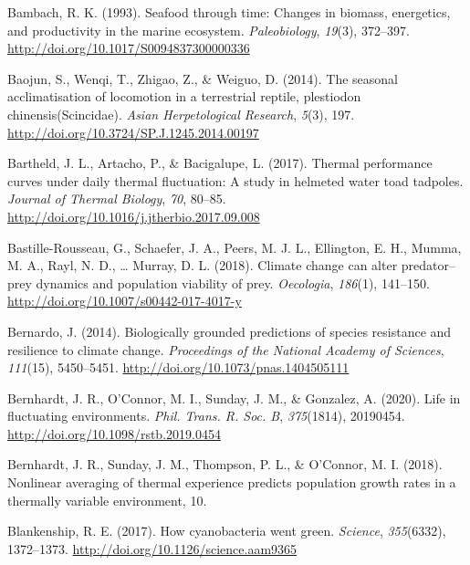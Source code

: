 \documentclass[12pt,twoside]{reedthesis}
\begin{document}
\leavevmode\hypertarget{ref-bambach_seafood_1993}{}%
Bambach, R. K. (1993). Seafood through time: Changes in biomass, energetics, and productivity in the marine ecosystem. \emph{Paleobiology}, \emph{19}(3), 372--397. \url{http://doi.org/10.1017/S0094837300000336}

\leavevmode\hypertarget{ref-baojun_seasonal_2014}{}%
Baojun, S., Wenqi, T., Zhigao, Z., \& Weiguo, D. (2014). The seasonal acclimatisation of locomotion in a terrestrial reptile, plestiodon chinensis(Scincidae). \emph{Asian Herpetological Research}, \emph{5}(3), 197. \url{http://doi.org/10.3724/SP.J.1245.2014.00197}

\leavevmode\hypertarget{ref-bartheld_thermal_2017-2}{}%
Bartheld, J. L., Artacho, P., \& Bacigalupe, L. (2017). Thermal performance curves under daily thermal fluctuation: A study in helmeted water toad tadpoles. \emph{Journal of Thermal Biology}, \emph{70}, 80--85. \url{http://doi.org/10.1016/j.jtherbio.2017.09.008}

\leavevmode\hypertarget{ref-bastille-rousseau_climate_2018}{}%
Bastille-Rousseau, G., Schaefer, J. A., Peers, M. J. L., Ellington, E. H., Mumma, M. A., Rayl, N. D., \ldots{} Murray, D. L. (2018). Climate change can alter predator--prey dynamics and population viability of prey. \emph{Oecologia}, \emph{186}(1), 141--150. \url{http://doi.org/10.1007/s00442-017-4017-y}

\leavevmode\hypertarget{ref-bernardo_biologically_2014}{}%
Bernardo, J. (2014). Biologically grounded predictions of species resistance and resilience to climate change. \emph{Proceedings of the National Academy of Sciences}, \emph{111}(15), 5450--5451. \url{http://doi.org/10.1073/pnas.1404505111}

\leavevmode\hypertarget{ref-bernhardt_life_2020}{}%
Bernhardt, J. R., O'Connor, M. I., Sunday, J. M., \& Gonzalez, A. (2020). Life in fluctuating environments. \emph{Phil. Trans. R. Soc. B}, \emph{375}(1814), 20190454. \url{http://doi.org/10.1098/rstb.2019.0454}

\leavevmode\hypertarget{ref-bernhardt_nonlinear_2018}{}%
Bernhardt, J. R., Sunday, J. M., Thompson, P. L., \& O'Connor, M. I. (2018). Nonlinear averaging of thermal experience predicts population growth rates in a thermally variable environment, 10.

\leavevmode\hypertarget{ref-blankenship_how_2017}{}%
Blankenship, R. E. (2017). How cyanobacteria went green. \emph{Science}, \emph{355}(6332), 1372--1373. \url{http://doi.org/10.1126/science.aam9365}
\end{document}
